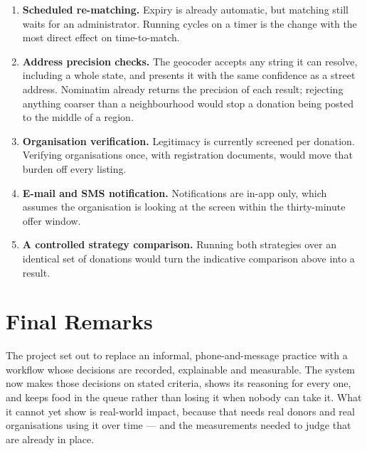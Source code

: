 \documentclass[11pt,a4paper]{report}
\begin{document}
\begin{enumerate}
  \item \textbf{Scheduled re-matching.} Expiry is already automatic, but matching
    still waits for an administrator. Running cycles on a timer is the change
    with the most direct effect on time-to-match.
  \item \textbf{Address precision checks.} The geocoder accepts any string it can
    resolve, including a whole state, and presents it with the same confidence as
    a street address. Nominatim already returns the precision of each result;
    rejecting anything coarser than a neighbourhood would stop a donation being
    posted to the middle of a region.
  \item \textbf{Organisation verification.} Legitimacy is currently screened per
    donation. Verifying organisations once, with registration documents, would
    move that burden off every listing.
  \item \textbf{E-mail and SMS notification.} Notifications are in-app only, which
    assumes the organisation is looking at the screen within the thirty-minute
    offer window.
  \item \textbf{A controlled strategy comparison.} Running both strategies over an
    identical set of donations would turn the indicative comparison above into a
    result.
\end{enumerate}

\section{Final Remarks}

The project set out to replace an informal, phone-and-message practice with a
workflow whose decisions are recorded, explainable and measurable. The system
now makes those decisions on stated criteria, shows its reasoning for every one,
and keeps food in the queue rather than losing it when nobody can take it. What
it cannot yet show is real-world impact, because that needs real donors and real
organisations using it over time --- and the measurements needed to judge that
are already in place.
\end{document}
